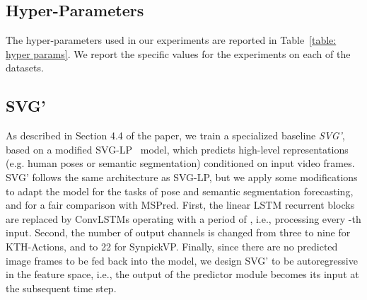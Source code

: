 \documentclass{bmvc2k}
\newcommand{\Table}[1]{Table~\ref{#1}}
\begin{document}
\subsection{Hyper-Parameters}
\label{subsection: hyper-params}

The hyper-parameters used in our experiments are reported in \Table{table: hyper params}. We report the specific values for the experiments on each of the datasets.



\subsection{SVG'}
\label{subsection: SVG'}
As described in Section 4.4 of the paper, we train a specialized baseline \emph{SVG’}, based on a modified SVG-LP~\cite{Denton_StochasticVideoGenerationWithALearnedPrior_2018} model, which predicts high-level representations (e.g. human poses or semantic segmentation) conditioned on input video frames.
SVG' follows the same architecture as SVG-LP, but we apply some modifications to adapt the model for the tasks of pose and semantic segmentation forecasting, and for a fair comparison with MSPred.
First, the linear LSTM recurrent blocks are replaced by ConvLSTMs operating with a period of , i.e., processing every -th input.
Second, the number of output channels is changed from three to nine for KTH-Actions, and to 22 for SynpickVP. 
Finally, since there are no predicted image frames to be fed back into the model, we design SVG' to be autoregressive in the feature space, i.e., the output of the predictor module becomes its input at the subsequent time step.
\end{document}
